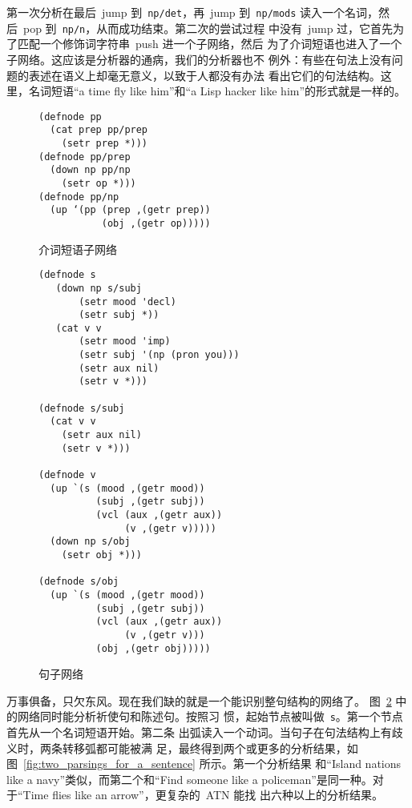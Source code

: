 第一次分析在最后~jump 到~\texttt{np/det}，再~jump 到~\texttt{np/mods}
读入一个名词，然后~pop 到~\texttt{np/n}，从而成功结束。第二次的尝试过程
中没有~jump 过，它首先为了匹配一个修饰词字符串~push 进一个子网络，然后
为了介词短语也进入了一个子网络。这应该是分析器的通病，我们的分析器也不
例外：有些在句法上没有问题的表述在语义上却毫无意义，以致于人都没有办法
看出它们的句法结构。这里，名词短语``a time fly like him''和``a Lisp
hacker like him''的形式就是一样的。

\begin{figure}
\begin{lstlisting}
(defnode pp
  (cat prep pp/prep
    (setr prep *)))
(defnode pp/prep
  (down np pp/np
    (setr op *)))
(defnode pp/np
  (up ‘(pp (prep ,(getr prep))
           (obj ,(getr op)))))
\end{lstlisting}
  \caption{介词短语子网络}
  \label{fig:prepositional_phrase_sub-network}
\end{figure}


\begin{figure}
\begin{lstlisting}
(defnode s
   (down np s/subj
       (setr mood 'decl)
       (setr subj *))
   (cat v v
       (setr mood 'imp)
       (setr subj '(np (pron you)))
       (setr aux nil)
       (setr v *)))

(defnode s/subj
  (cat v v
    (setr aux nil)
    (setr v *)))

(defnode v
  (up `(s (mood ,(getr mood))
          (subj ,(getr subj))
          (vcl (aux ,(getr aux))
               (v ,(getr v)))))
  (down np s/obj
    (setr obj *)))

(defnode s/obj
  (up `(s (mood ,(getr mood))
          (subj ,(getr subj))
          (vcl (aux ,(getr aux))
               (v ,(getr v)))
          (obj ,(getr obj)))))
\end{lstlisting}
  \caption{句子网络}
  \label{fig:sentence_network}
\end{figure}

万事俱备，只欠东风。现在我们缺的就是一个能识别整句结构的网络了。
图~\ref{fig:sentence_network} 中的网络同时能分析祈使句和陈述句。按照习
惯，起始节点被叫做~\texttt{s}。第一个节点首先从一个名词短语开始。第二条
出弧读入一个动词。当句子在句法结构上有歧义时，两条转移弧都可能被满
足，最终得到两个或更多的分析结果，如
图~\ref{fig:two_parsings_for_a_sentence} 所示。第一个分析结果
和``Island nations like a navy''类似，而第二个和``Find someone like a
policeman''是同一种。对于``Time flies like an arrow''，更复杂的~\textsc{ATN} 能找
出六种以上的分析结果。


